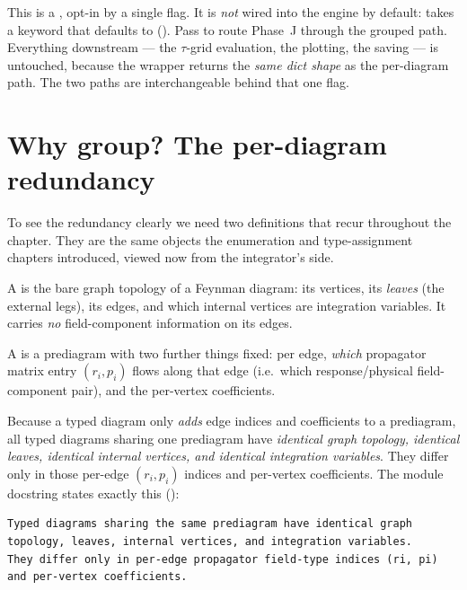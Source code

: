 \begin{note}
This is a , opt-in by a single flag. It is \emph{not} wired into
the engine by default:  takes a keyword
 that defaults to 
(). Pass  to
route Phase~J through the grouped path. Everything downstream --- the $\tau$-grid
evaluation, the plotting, the saving --- is untouched, because the wrapper
returns the \emph{same dict shape} as the per-diagram path. The two paths are
interchangeable behind that one flag.
\end{note}

\section{Why group? The per-diagram redundancy}

To see the redundancy clearly we need two definitions that recur throughout the
chapter. They are the same objects the enumeration and type-assignment chapters
introduced, viewed now from the integrator's side.

\begin{defn}
A  is the bare graph topology of a Feynman diagram: its
vertices, its \emph{leaves} (the external legs), its edges, and which internal
vertices are integration variables. It carries \emph{no} field-component
information on its edges.

A  is a prediagram with two further things fixed: per edge,
\emph{which} propagator matrix entry $(r_i, p_i)$ flows along that edge (i.e.\
which response/physical field-component pair), and the per-vertex coefficients.
\end{defn}

Because a typed diagram only \emph{adds} edge indices and coefficients to a
prediagram, all typed diagrams sharing one prediagram have \emph{identical graph
topology, identical leaves, identical internal vertices, and identical
integration variables}. They differ only in those per-edge $(r_i, p_i)$ indices
and per-vertex coefficients. The module docstring states exactly this
(\file{grouped\_integral.py:9--13}):

\begin{lstlisting}[style=console]
Typed diagrams sharing the same prediagram have identical graph
topology, leaves, internal vertices, and integration variables.
They differ only in per-edge propagator field-type indices (ri, pi)
and per-vertex coefficients.
\end{lstlisting}

